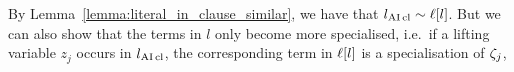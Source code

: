 \documentclass[,%
	paper=a4,%
	DIV12, %
	twoside=false,%
	liststotoc,
	bibtotoc,
	draft=false,%
	numbers=noendperiod
]{scrartcl}
\begin{document}
By Lemma~\ref{lemma:literal_in_clause_similar}, we have that $l_{\operatorname{AI}\mathrm{cl}} \sim \ell[l]$.
But we can also show that the terms in $l$ only become more specialised, i.e.\ if a lifting variable $z_j$ occurs in $l_{\operatorname{AI}\mathrm{cl}}$, the corresponding term in $\ell[l]$ is a specialisation of $\zeta_{j}$, 


\begin{comment}
\cbstart
\begin{lemma}[Strenghtening of \ref{lemma:literal_in_clause_similar}]
	\label{lemma:literal_in_clause_similar_strenghtened}

	If $s\cl$ is a lifting variable $z_i$ and $\lifboth{s} = z_j$ (i.e.\ $s=\colterm{j}$),
	then there is a substitution $\rho$ such that $\colterm{i}\rho = \colterm{j}$.
\end{lemma} 
\begin{proof}
	Note that if $i=j$, the $\rho$ is the identity function.

	Note that by Lemma~\ref{lemma:literal_in_clause_similar}, $s\cl \sim \lifboth{s}$.

	At some point in the resolution proof, $s\cl = z_i$ was introduced in $\AIclause(C^*)$ for a clause $C^*$. 
	Hence the corresponding term in $C^*$ is $\colterm{i}$.

	In the resolution derivation, $\colterm{i}$ is, in general, changed by means of substitution, so $s$ in later stages of the proof refers to $\colterm{i}\sigma^*$ for some $\sigma^*$.

	If $z_i$ is never affected by $\tau$, we are done.

	Suppose that at the position of $s\cl$, $z_k$ is introduced and later changed to $z_i$.
	We have to show that there is a substitution $\rho$ such that $\colterm{k}\rho = \colterm{i}$.
	See Lemma~\ref{lemma:tau_is_specialisation}.
\end{proof}
\cbend
\end{comment}
\end{document}
